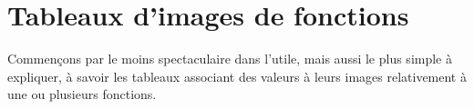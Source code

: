\documentclass[10pt, a4paper]{article}
\begin{document}
\section{Tableaux d'images de fonctions}

Commençons par le moins spectaculaire dans l'utile, mais aussi le plus simple à expliquer, à savoir les tableaux associant des valeurs à leurs images relativement à une ou plusieurs fonctions.
\end{document}
